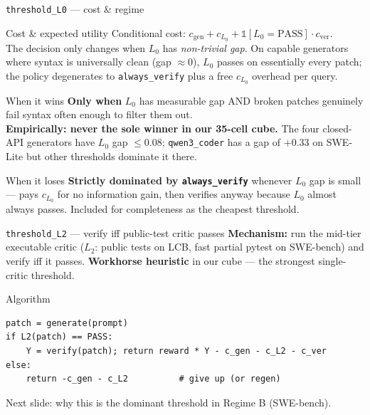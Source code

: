 \documentclass[10pt]{beamer}
\newcommand{\good}[1]{\textcolor{accentGreen}{\textbf{#1}}}
\newcommand{\bad}[1]{\textcolor{accentRed}{\textbf{#1}}}
\newcommand{\info}[1]{\textcolor{primaryBlue}{\textbf{#1}}}
\begin{document}
\begin{frame}[fragile]{\texttt{threshold\_L0} --- cost \& regime}
\begin{block}{Cost \& expected utility}
\footnotesize
Conditional cost: $c_\text{gen} + c_{L_0} + \mathbb{1}[L_0{=}\text{PASS}] \cdot c_\text{ver}$.\\[3pt]
The decision only changes when $L_0$ has \emph{non-trivial gap}. On capable
generators where syntax is universally clean (gap $\approx 0$), $L_0$ passes
on essentially every patch; the policy degenerates to \texttt{always\_verify}
plus a free $c_{L_0}$ overhead per query.
\end{block}

\begin{exampleblock}{When it wins}
\good{Only when} $L_0$ has measurable gap AND broken patches genuinely fail
syntax often enough to filter them out. \\
\textbf{Empirically: never the sole winner in our 35-cell cube.} The four
closed-API generators have $L_0$ gap $\leq 0.08$; \texttt{qwen3\_coder} has
a gap of $+0.33$ on SWE-Lite but other thresholds dominate it there.
\end{exampleblock}

\begin{alertblock}{When it loses}
\bad{Strictly dominated by \texttt{always\_verify}} whenever $L_0$ gap is
small --- pays $c_{L_0}$ for no information gain, then verifies anyway
because $L_0$ almost always passes. Included for completeness as the
cheapest threshold.
\end{alertblock}
\end{frame}

\begin{frame}[fragile]{\texttt{threshold\_L2} --- verify iff public-test critic passes}
\info{Mechanism:} run the mid-tier executable critic ($L_2$: public tests
on LCB, fast partial pytest on SWE-bench) and verify iff it passes.
\good{Workhorse heuristic} in our cube --- the strongest single-critic
threshold.

\begin{block}{Algorithm}
\begin{lstlisting}
patch = generate(prompt)
if L2(patch) == PASS:
    Y = verify(patch); return reward * Y - c_gen - c_L2 - c_ver
else:
    return -c_gen - c_L2          # give up (or regen)
\end{lstlisting}
\end{block}

\textcolor{softGrey}{\scriptsize Next slide: why this is the dominant
threshold in Regime B (SWE-bench).}
\end{frame}
\end{document}
